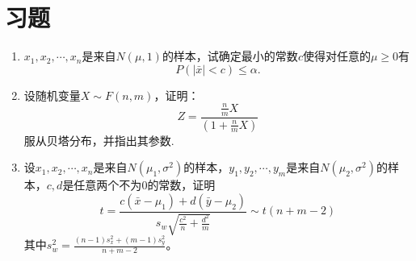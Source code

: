 \section{习题}
\begin{enumerate}
    \item $x_1,x_2,\cdots,x_n$是来自$N(\mu,1)$的样本，试确定最小的常数$c$使得对任意的$\mu\geq 0$有
$$P(|\bar{x}|< c) \leq \alpha. $$

\item 设随机变量$X \sim F(n,m)$，证明：
$$Z = \frac{\frac{n}{m}X}{(1+\frac{n}{m}X)}$$
服从贝塔分布，并指出其参数.

\item 设$x_1,x_2,\cdots,x_n$是来自$N(\mu_1,\sigma^2)$的样本，$y_1,y_2,\cdots,y_m$是来自$N(\mu_2,\sigma^2)$的样本，$c,d$是任意两个不为$0$的常数，证明
$$
	t =  \frac{c(\bar{x} - \mu_1) + d(\bar{y} - \mu_2)}{s_w\sqrt{\frac{c^2}{n} + \frac{d^2}{m}}} \sim t(n+m-2)
	$$
其中$s_w^2 =  \frac{(n-1)s_x^2 + (m-1)s_y^2}{n+m-2}$。
\end{enumerate}
